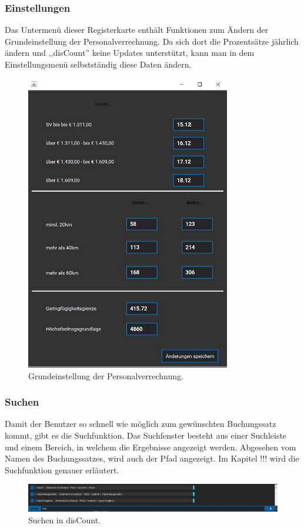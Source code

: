 \documentclass[12pt]{report}
\begin{document}
\subsubsection{Einstellungen}
Das Untermenü dieser Registerkarte enthält Funktionen zum Ändern der Grundeinstellung der Personalverrechnung. Da sich dort die Prozentsätze jährlich ändern und ,,disCount'' keine Updates unterstützt, kann man in dem Einstellungsmenü selbstständig diese Daten ändern.

\begin{figure}[h]
	\centering
	\includegraphics[height=13cm]{images/einstellungen}
	\caption[Einstellungen]{Grundeinstellung der Personalverrechnung.}
\end{figure}

\subsubsection{Suchen}
Damit der Benutzer so schnell wie möglich zum gewünschten Buchungssatz kommt, gibt es die Suchfunktion. Das Suchfenster besteht aus einer Suchleiste und einem Bereich, in welchem die Ergebnisse angezeigt werden. Abgesehen vom Namen des Buchungssatzes, wird auch der Pfad angezeigt. Im Kapitel !!! wird die Suchfunktion genauer erläutert.

\begin{figure}[h]
	\centering
	\includegraphics[width=16cm]{images/suchen}
	\caption[Suchen]{Suchen in disCount.}
\end{figure}
\end{document}
